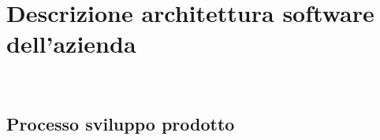 
\chapter{Descrizione architettura software dell'azienda}
\label{cap:descrizione-architettura}

\\

\section{Processo sviluppo prodotto}